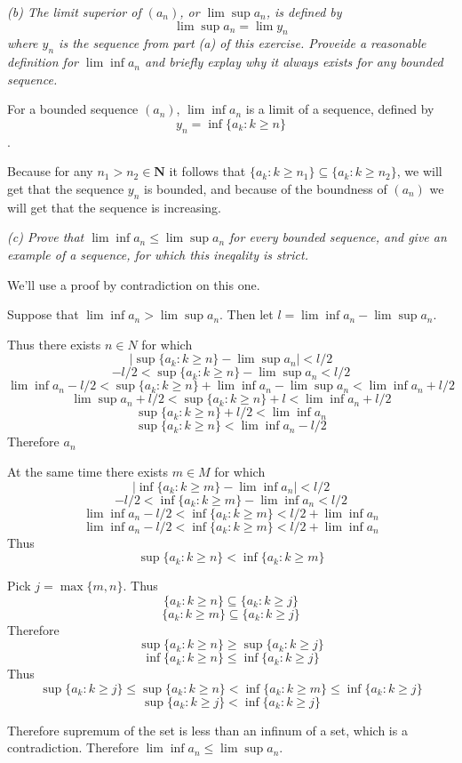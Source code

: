 \documentclass[11pt,oneside,titlepage]{article}
\begin{document}
\textit{(b) The limit superior of $(a_n)$, or $\lim\sup a_n$, is defined by}
$$\lim \sup a_n = \lim y_n$$
\textit{where $y_n$ is the sequence from part (a) of this exercise. Proveide
  a reasonable definition for $\lim\inf a_n$ and briefly explay why it always
  exists for any bounded sequence.}

For a bounded sequence $(a_n)$, $\lim\inf a_n$ is a limit of a sequence,
defined by
$$y_n = \inf\{a_k: k \geq n\}$$.

Because for any $n_1 > n_2 \in \textbf{N}$ it follows that
$\{a_k: k \geq n_1\} \subseteq \{a_k: k \geq n_2\}$, we
will get that the sequence $y_n$ is bounded, and because of the
boundness of $(a_n)$ we will get that the sequence is increasing.

\textit {(c) Prove that $\lim\inf a_n \leq \lim \sup a_n$ for every bounded
  sequence, and give an example of a sequence, for which this ineqality is
  strict.}

We'll use a proof by contradiction on this one.

Suppose that $\lim\inf a_n > \lim \sup a_n$. Then let $l = \lim\inf a_n -
\lim \sup a_n$.

Thus there exists $n \in N$ for which
$$|\sup\{a_k: k \geq n\} - \lim\sup a_n| < l/2$$
$$-l/2 < \sup\{a_k: k \geq n\} - \lim\sup a_n < l/2$$
$$ \lim\inf a_n - l/2 < \sup\{a_k: k \geq n\} + \lim\inf a_n - \lim\sup a_n <\lim\inf a_n +  l/2$$
$$ \lim\sup a_n + l/2 < \sup\{a_k: k \geq n\} + l < \lim\inf a_n + l/2$$
$$  \sup\{a_k: k \geq n\} + l/2 < \lim\inf a_n $$
$$  \sup\{a_k: k \geq n\} < \lim\inf a_n - l/2$$
Therefore $a_n $

At the same time there exists $m \in M$ for which
$$|\inf\{a_k: k \geq m\} - \lim\inf a_n| < l/2$$
$$-l/2 < \inf\{a_k: k \geq m\} - \lim\inf a_n < l/2$$
$$\lim\inf a_n -l/2 < \inf\{a_k: k \geq m\}  < l/2 + \lim\inf a_n$$
$$\lim\inf a_n - l/2 < \inf\{a_k: k \geq m\}  <  l/2 + \lim\inf a_n$$
Thus
$$  \sup\{a_k: k \geq n\} < \inf\{a_k: k \geq m\}$$

Pick $j = \max\{m, n\}$.  Thus 
$$\{a_k: k \geq n\} \subseteq \{a_k: k \geq j\}$$
$$\{a_k: k \geq m\} \subseteq \{a_k: k \geq j\}$$
Therefore
$$ \sup\{a_k: k \geq n\} \geq \sup \{a_k: k \geq j\}$$
$$ \inf\{a_k: k \geq n\} \leq \inf \{a_k: k \geq j\}$$
Thus 
$$ \sup \{a_k: k \geq j\} \leq \sup\{a_k: k \geq n\} < \inf\{a_k: k \geq m\}
\leq \inf \{a_k: k \geq j\} $$
$$ \sup \{a_k: k \geq j\} <  \inf \{a_k: k \geq j\} $$

Therefore supremum of the set is less than an infinum of a set, which is
a contradiction. Therefore $\lim\inf a_n \leq \lim \sup a_n$.
\end{document}
